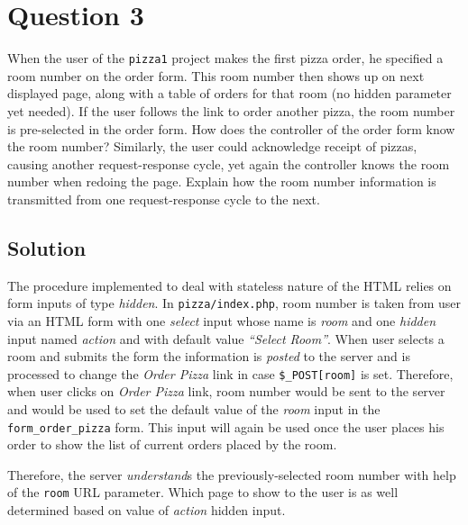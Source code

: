 
\section*{Question 3}

When the user of the \texttt{pizza1} project makes the first pizza order, he specified a room number on the order form. This room number then shows up on next displayed page, along with a table of orders for that room (no hidden parameter yet needed). If the user follows the link to order another pizza, the room number is pre-selected in the order form. How does the controller of the order form know the room number? Similarly, the user could acknowledge receipt of pizzas, causing another request-response cycle, yet again the controller knows the room number when redoing the page. Explain how the room number information is transmitted from one request-response cycle to the next.

\subsection*{Solution}
The procedure implemented to deal with stateless nature of the HTML relies on form inputs of type \textit{hidden}. In \texttt{pizza/index.php}, room number is taken from user via an HTML form with one \textit{select} input whose name is \textit{room} and one \textit{hidden} input named \textit{action} and with default value \textit{``Select Room''}. When user selects a room and submits the form the information is \textit{posted} to the server and is processed to change the \textit{Order Pizza} link in case \texttt{\$\_POST[room]} is set. Therefore, when user clicks on \textit{Order Pizza} link, room number would be sent to the server and would be used to set the default value of the \textit{room} input in the \texttt{form\_order\_pizza} form. This input will again be used once the user places his order to show the list of current orders placed by the room.

Therefore, the server \textit{understand}s the previously-selected room number with help of the \texttt{room} URL parameter. Which page to show to the user is as well determined based on value of \textit{action} hidden input.

